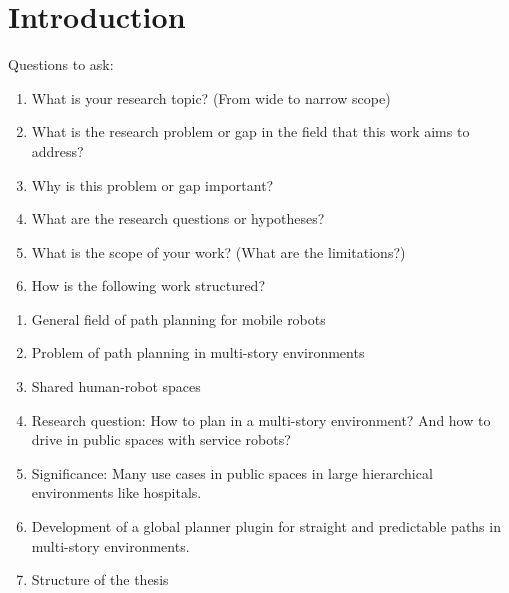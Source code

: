 
\chapter{Introduction}
\label{sec:introduction}
Questions to ask:
\begin{enumerate}
    \item What is your research topic? (From wide to narrow scope)
    \item What is the research problem or gap in the field that this work aims to address?
    \item Why is this problem or gap important?
    \item What are the research questions or hypotheses? 
    \item What is the scope of your work? (What are the limitations?)
    \item How is the following work structured?
\end{enumerate}

\begin{enumerate}
    \item General field of path planning for mobile robots
    \item Problem of path planning in multi-story environments
    \item Shared human-robot spaces
    \item Research question: How to plan in a multi-story environment? And how to drive in public spaces with service robots?
    \item Significance: Many use cases in public spaces in large hierarchical environments like hospitals.
    \item Development of a global planner plugin for straight and predictable paths in multi-story environments.
    \item Structure of the thesis
\end{enumerate}



